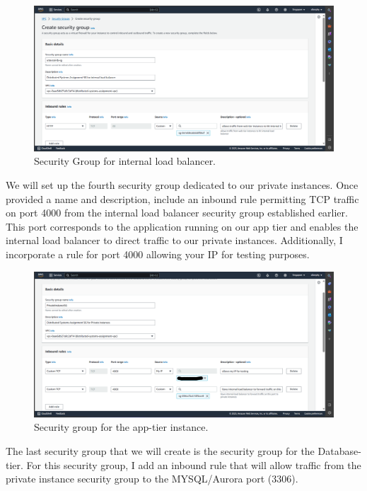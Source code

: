 \documentclass{article}
\begin{document}
\begin{figure}[h]
    \centering
    \includegraphics[width=12cm]{Pictures/Networking and Security/SG_create_3.png}
    \caption{Security Group for internal load balancer.}
    \label{fig:enter-label}
\end{figure}

We will set up the fourth security group dedicated to our private instances. Once provided a name and description, include an inbound rule permitting TCP traffic on port 4000 from the internal load balancer security group established earlier. This port corresponds to the application running on our app tier and enables the internal load balancer to direct traffic to our private instances. Additionally, I incorporate a rule for port 4000 allowing your IP for testing purposes.\par

\newpage
\begin{figure}[h]
    \centering
    \includegraphics[width=12cm]{Pictures/Networking and Security/SG_create_4.png}
    \caption{Security group for the app-tier instance.}
    \label{fig:enter-label}
\end{figure}

The last security group that we will create is the security group for the Database-tier. For this security group, I add an inbound rule that will allow traffic from the private instance security group to the MYSQL/Aurora port (3306).
\end{document}

